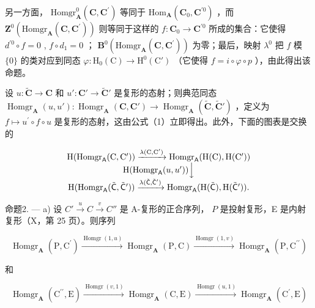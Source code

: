 另一方面， \(\mathrm{Homgr}_{\mathbf{A}}^{0}(\mathbf{C},\mathbf{C}^{\prime})\) 等同于 \(\mathrm{Hom}_{\mathbf{A}}(\mathbf{C}_{0},\mathbf{C}^{\prime 0})\) ，而 \(\mathbf{Z}^{0}(\mathrm{Homgr}_{\mathbf{A}}(\mathbf{C},\mathbf{C}^{\prime}))\) 则等同于这样的 \(f:\mathbf{C}_{0}\to \mathbf{C}^{\prime 0}\) 所成的集合：它使得 \(d^{\prime 0}\circ f = 0\) , \(f\circ d_{1} = 0\) ； \(\mathbf{B}^{0}(\mathrm{Homgr}_{\mathbf{A}}(\mathbf{C},\mathbf{C}^{\prime}))\) 为零；最后，映射 \(\lambda^0\) 把 \(f\) 模 \(\{0\}\) 的类对应到同态 \(\varphi :\mathrm{H}_0(\mathrm{C})\to \mathrm{H}^0 (\mathrm{C}')\) （它使得 \(f = i\circ \varphi \circ p\) ），由此得出该命题。

设 \(u: \tilde{\mathbf{C}} \to \mathbf{C}\) 和 \(u': \mathbf{C}' \to \tilde{\mathbf{C}}'\) 是复形的态射；则典范同态 \(\operatorname{Homgr}_{\mathbf{A}}(u, u') : \operatorname{Homgr}_{\mathbf{A}}(\mathbf{C}, \mathbf{C}') \to \operatorname{Homgr}_{\mathbf{A}}(\tilde{\mathbf{C}}, \tilde{\mathbf{C}}')\) ，定义为 \(f\mapsto u^{\prime}\circ f\circ u\) 是复形的态射，这由公式（1）立即得出。此外，下面的图表是交换的

\[
\begin{array}{c} \mathrm{H} (\mathrm{Homgr} _ {\mathsf {A}} (\mathrm{C}, \mathrm{C} ^ {\prime})) \xrightarrow {\lambda (\mathrm{C} , \mathrm{C} ^ {\prime})} \mathrm{Homgr} _ {\mathsf {A}} (\mathrm{H} (\mathrm{C}), \mathrm{H} (\mathrm{C} ^ {\prime})) \\ \mathrm{H} (\mathrm{Homgr} _ {\mathsf {A}} (u, u ^ {\prime})) \Big \downarrow \\ \mathrm{H} (\mathrm{Homgr} _ {\mathsf {A}} (\tilde {\mathsf {C}}, \tilde {\mathsf {C}} ^ {\prime})) \xrightarrow {\lambda (\tilde {\mathsf {C}} , \tilde {\mathsf {C}} ^ {\prime})} \mathrm{Homgr} _ {\mathsf {A}} (\mathrm{H} (\tilde {\mathsf {C}}), \mathrm{H} (\tilde {\mathsf {C}} ^ {\prime}))  . \end{array}
\]

命题2. --- a) 设 \(C' \xrightarrow{u} C \xrightarrow{v} C''\) 是 A-复形的正合序列， \(P\) 是投射复形，E 是内射复形（X，第 25 页）。则序列

\[
\operatorname{Homgr} _ {\mathbf {A}} (\mathrm{P}, \mathrm{C} ^ {\prime}) \xrightarrow {\operatorname{Homgr} (1 , u)} \operatorname{Homgr} _ {\mathbf {A}} (\mathrm{P}, \mathrm{C}) \xrightarrow {\operatorname{Homgr} (1 , v)} \operatorname{Homgr} _ {\mathbf {A}} (\mathrm{P}, \mathrm{C} ^ {\prime \prime})
\]

和

\[
\operatorname{Homgr} _ {\mathbf {A}} \left(\mathrm{C} ^ {\prime \prime}, \mathrm{E}\right) \xrightarrow {\operatorname{Homgr} (v , 1)} \operatorname{Homgr} _ {\mathbf {A}} (\mathrm{C}, \mathrm{E}) \xrightarrow {\operatorname{Homgr} (u , 1)} \operatorname{Homgr} _ {\mathbf {A}} \left(\mathrm{C} ^ {\prime}, \mathrm{E}\right)
\]

